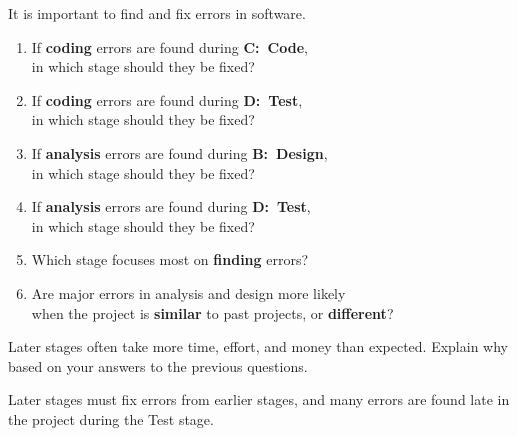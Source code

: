 \newpage

\Q It is important to find and fix errors in software.

\begin{enumerate}%

\item If \textbf{coding} errors are found during \textbf{C:~Code}, \\ in which stage should they be fixed?

\item If \textbf{coding} errors are found during \textbf{D:~Test}, \\ in which stage should they be fixed?

\item If \textbf{analysis} errors are found during \textbf{B:~Design}, \\ in which stage should they be fixed?

\item If \textbf{analysis} errors are found during \textbf{D:~Test}, \\ in which stage should they be fixed?

\item Which stage focuses most on \textbf{finding} errors?

\item Are major errors in analysis and design more likely \\ when the project is \textbf{similar} to past projects, or \textbf{different}?

\end{enumerate}


\Q Later stages often take more time, effort, and money than expected.
Explain why based on your answers to the previous questions.

\begin{answer}
Later stages must fix errors from earlier stages, and many errors are found late in the project during the Test stage.
\end{answer}
